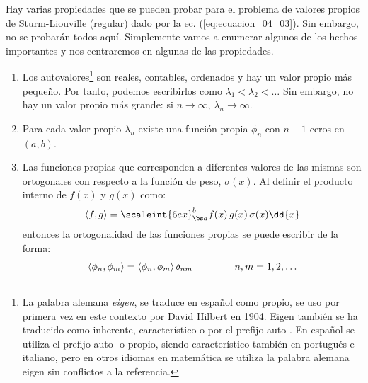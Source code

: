 Hay varias propiedades que se pueden probar para el problema de valores propios de Sturm-Liouville (regular) dado por la ec. (\ref{eq:ecuacion_04_03}). Sin embargo, no se probarán todos aquí. Simplemente vamos a enumerar algunos de los hechos importantes y nos centraremos en algunas de las propiedades.
\begin{enumerate}
\item Los autovalores\footnote{La palabra alemana \emph{eigen}, se traduce en español como propio, se uso por primera vez en este contexto por David Hilbert en 1904. Eigen también se ha traducido como inherente, característico o por el prefijo auto-. En español se utiliza el prefijo auto- o propio, siendo característico también en portugués e italiano, pero en otros idiomas en matemática se utiliza la palabra alemana eigen sin conflictos a la referencia.} son reales, contables, ordenados y hay un valor propio más pequeño. Por tanto, podemos escribirlos como $\lambda_{1} < \lambda_{2} < \ldots $ Sin embargo, no hay un valor propio más grande: si $n \to \infty$, $\lambda_{n} \to \infty$.
\item Para cada valor propio $\lambda_{n}$ existe una función propia $\phi_{n}$ con $n - 1$ ceros en $(a, b)$.
\item Las funciones propias que corresponden a diferentes valores de las mismas son ortogonales con respecto a la función de peso, $\sigma (x)$. Al definir el producto interno de $f (x)$ y $g (x)$ como:
\begin{align}
\langle f , g \rangle = \scaleint{6ex}_{\bs a}^{b} f(x) \, g(x) \, \sigma(x) \dd{x}
\label{eq:ecuacion_04_11}
\end{align}
entonces la ortogonalidad de las funciones propias se puede escribir de la forma:
\begin{align}
\langle \phi_{n}, \phi_{m} \rangle = \langle \phi_{n}, \phi_{m} \rangle \, \delta_{nm} \hspace{1.5cm} n, m = 1, 2, \ldots
\label{eq:ecuacion_04_12}
\end{align}


\end{enumerate}
